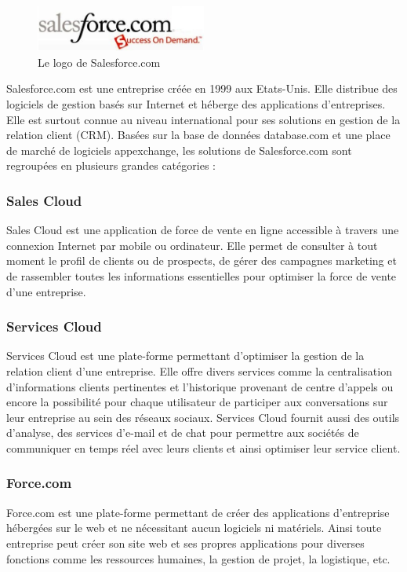 \documentclass[a4paper,12pt]{report}
\begin{document}
\begin{onehalfspace}
	\paragraph*{}
		\begin{figure}
			\centering
			\includegraphics[width=0.5\textwidth]{salesforce.jpg} 
			\caption{Le logo de Salesforce.com}
		\end{figure}
	Salesforce.com est une entreprise créée en 1999 aux Etats-Unis. Elle distribue des logiciels de gestion basés sur Internet et héberge des applications d'entreprises. Elle est surtout connue au niveau international pour ses solutions en gestion de la relation client (CRM). Basées sur la base de données database.com et une place de marché de logiciels appexchange, les solutions de Salesforce.com sont regroupées en plusieurs grandes catégories : 
	\subsubsection{Sales Cloud}
Sales Cloud est une application de force de vente en ligne accessible à travers une connexion Internet par mobile ou ordinateur. Elle permet de consulter à tout moment le profil de clients ou de prospects, de gérer des campagnes marketing et de rassembler toutes les informations essentielles pour optimiser la force de vente d'une entreprise.

	\subsubsection{Services Cloud}
Services Cloud est une plate-forme permettant d'optimiser la gestion de la relation client d’une entreprise. Elle offre divers services comme la centralisation d'informations clients pertinentes et l’historique provenant de centre d’appels ou encore la possibilité pour chaque utilisateur de participer aux conversations sur leur entreprise au sein des réseaux sociaux. Services Cloud fournit aussi des outils d’analyse, des services d'e-mail et de chat pour permettre aux sociétés de communiquer en temps réel avec leurs clients et ainsi optimiser leur service client.

	\subsubsection{Force.com}
Force.com est une plate-forme permettant de créer des applications d’entreprise hébergées sur le web et ne nécessitant aucun logiciels ni matériels. Ainsi toute entreprise peut créer son site web et ses propres applications pour diverses fonctions comme les ressources humaines, la gestion de projet, la logistique, etc.


\end{onehalfspace}
\end{document}
